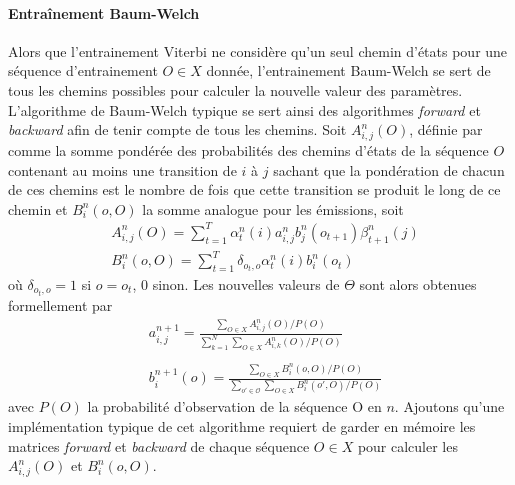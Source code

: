 \documentclass[letterpaper]{article}
\begin{document}
\paragraph{Entraînement Baum-Welch} Alors que l'entrainement Viterbi ne considère qu'un seul chemin d'états pour une séquence d'entrainement $O \in X$ donnée, l'entrainement Baum-Welch se sert de tous les chemins possibles pour calculer la nouvelle valeur des paramètres. L'algorithme de Baum-Welch typique se sert ainsi des algorithmes \textit{forward} et \textit{backward} afin de tenir compte de tous les chemins. Soit $A_{i,j}^n(O)$, définie par \cite{MM} comme la somme pondérée des probabilités des chemins d'états de la séquence $O$ contenant au moins une transition de $i$ à $j$ sachant que la pondération de chacun de ces chemins est le nombre de fois que cette transition se produit le long de ce chemin et $B_i^n(o, O)$ la somme analogue pour les émissions, soit 
\begin{equation} \label{eq:bw_1}
\begin{aligned}
	& A_{i,j}^n(O) = \sum\limits_{t=1}^T \alpha_t^n(i) a_{i,j}^n b_j^n(o_{t+1}) \beta_{t+1}^n(j) \\
	& B_{i}^n(o, O) = \sum\limits_{t=1}^T \delta_{o_t,o} \alpha_t^n(i) b_i^n(o_t) 
\end{aligned}
\end{equation}
où $\delta_{o_t, o} = 1$ si $o=o_t$, $0$ sinon. Les nouvelles valeurs de $\Theta$ sont alors obtenues formellement par 
\begin{equation} \label{eq:bw_2}
\begin{aligned}
	& a_{i,j}^{n+1} = \frac{\sum_{O \in X} A_{i,j}^n(O) / P(O)}{\sum_{k=1}^N \sum_{O \in X} A_{i,k}^n(O) / P(O)} \\ \\
	& b_i^{n+1}(o) = \frac{\sum_{O \in X} B_{i}^n(o, O) / P(O)}{\sum_{o' \in \mathcal{O}} \sum_{O \in X} B_{i}^n(o', O) / P(O)}
\end{aligned}
\end{equation}
avec $P(O)$ la probabilité d'observation de la séquence O en $n$. Ajoutons qu'une implémentation typique de cet algorithme requiert de garder en mémoire les matrices \textit{forward} et \textit{backward} de chaque séquence $O \in X$ pour calculer les $A_{i,j}^n(O)$ et $B_{i}^n(o, O)$.

\end{document}
